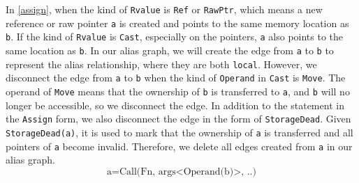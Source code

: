 In \autoref{assign},
when the kind of \texttt{Rvalue} is \texttt{Ref} or \texttt{RawPtr}, which means a new reference or raw pointer \texttt{a} is created and points to the same memory location as \texttt{b}.
%
If the kind of \texttt{Rvalue} is \texttt{Cast}, especially on the pointers, \texttt{a} also points to the same location as \texttt{b}.
In our alias graph, we will create the edge from \texttt{a} to \texttt{b} to represent the alias relationship, where they are both \texttt{local}.
%
However, we disconnect the edge from \texttt{a} to \texttt{b} when the kind of \texttt{Operand} in \texttt{Cast} is \texttt{Move}.
The operand of \texttt{Move} means that the ownership of \texttt{b} is transferred to \texttt{a}, and \texttt{b} will no longer be accessible, so we disconnect the edge.
In addition to the statement in the \texttt{Assign} form, we also disconnect the edge in the form of \texttt{StorageDead}. 
Given \texttt{StorageDead(a)}, it is used to mark that the ownership of \texttt{a} is transferred and all pointers of \texttt{a} become invalid.
Therefore, we delete all edges created from \texttt{a} in our alias graph.
%
\begin{equation} \label{function}
    \text{a} = \text{Call(Fn, args<Operand(b)>, ..)}
\end{equation}





